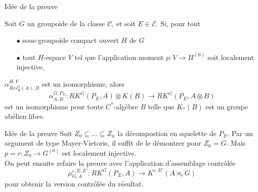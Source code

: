 \begin{frame}{Idée de la preuve}
\begin{thmfr}
Soit $G$ un groupoïde de la classe $\mathcal C$, et soit $E\in\mathcal E$. Si, pour tout 
\begin{itemize}
\item[$\bullet$] sous-groupoïde compact ouvert $H$ de $G$
\item[$\bullet$] tout $H$-espace $V$ tel que l'application moment $p : V\rightarrow H^{(0)}$ soit localement injective,
\end{itemize} 
$\alpha_{Res_H^G(A),B}^{H,V}$ est un isomorphisme, alors 
\[\alpha_{A,B}^{G,P_E}: RK^G(P_E,A)\otimes K(B)\rightarrow RK^G(P_E,A\otimes B) \] 
est un isomorphisme pour toute $C^*$-algèbre $B$ telle que $K_*(B)$ est un groupe abélien libre.\\
\end{thmfr}
\end{frame}

\begin{frame}{Idée de la preuve}
Soit $Z_0 \subseteq ...\subseteq Z_n$ la décompostion en squelette de $P_E$. Par un argument de type Mayer-Vietoris, il suffit de le démontrer pour $Z_0 = G$. Mais $p =r : Z_0 \rightarrow G^{(0)} $ est localement injective. \\
\vspace{0.3 cm}
On peut ensuite refaire la preuve avec l'application d'assemblage contrôlée
\[\mu_{G,A}^{\varepsilon, E,E'} : RK^G(P_E,A)\rightarrow K^{\varepsilon,E'}(A\rtimes_r G)\]
pour obtenir la version contrôlée du résultat.
\end{frame}

